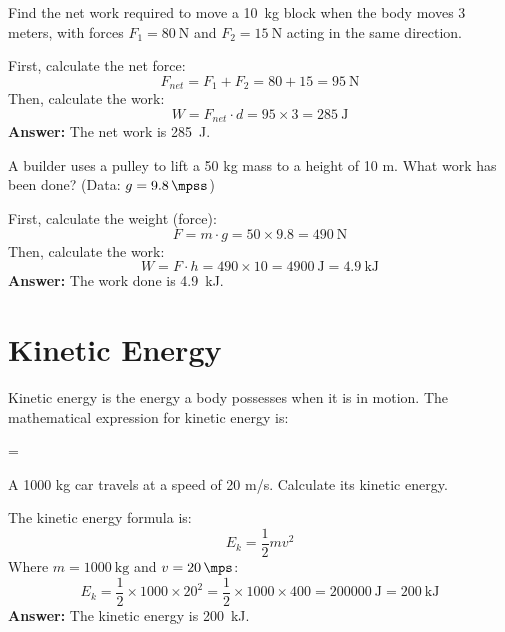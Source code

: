 \begin{exercise}
    Find the net work required to move a \qty{10}{\kilo\gram} block when the body moves 3 meters, with forces $F_1 = \qty{80}{\newton}$ and $F_2 = \qty{15}{\newton}$ acting in the same direction.
    \begin{solu}
        First, calculate the net force:
        \[
            F_{net} = F_1 + F_2 = 80 + 15 = \qty{95}{\newton}
        \]
        Then, calculate the work:
        \[
            W = F_{net} \cdot d = 95 \times 3 = \qty{285}{\joule}
        \]
        \textbf{Answer:} The net work is \qty{285}{\joule}.
    \end{solu}
\end{exercise}

\begin{exercise}
    A builder uses a pulley to lift a 50 kg mass to a height of 10 m. What work has been done? (Data: $g = \qty{9.8}{\mpss}$)
    \begin{solu}
        First, calculate the weight (force):
        \[
            F = m \cdot g = 50 \times 9.8 = \qty{490}{\newton}
        \]
        Then, calculate the work:
        \[
            W = F \cdot h = 490 \times 10 = \qty{4900}{\joule} = \qty{4.9}{\kilo\joule}
        \]
        \textbf{Answer:} The work done is \qty{4.9}{\kilo\joule}.
    \end{solu}
\end{exercise}


\section{Kinetic Energy}

Kinetic energy is the energy a body possesses when it is in motion.
The mathematical expression for kinetic energy is:

\vspace{12pt}
\begin{centeredequation}
    =
    \cdot
    \label{eq:energia_cinetica}
\end{centeredequation}
\vspace{12pt}


\begin{exercise}
    A 1000 kg car travels at a speed of 20 m/s. Calculate its kinetic energy.
    \begin{solu}
        The kinetic energy formula is:
        \[
            E_k = \frac{1}{2}mv^2
        \]
        Where $m = \qty{1000}{\kilo\gram}$ and $v = \qty{20}{\mps}$:
        \[
            E_k = \frac{1}{2} \times 1000 \times 20^2 = \frac{1}{2} \times 1000 \times 400 = \qty{200000}{\joule} = \qty{200}{\kilo\joule}
        \]
        \textbf{Answer:} The kinetic energy is \qty{200}{\kilo\joule}.
    \end{solu}
\end{exercise}

